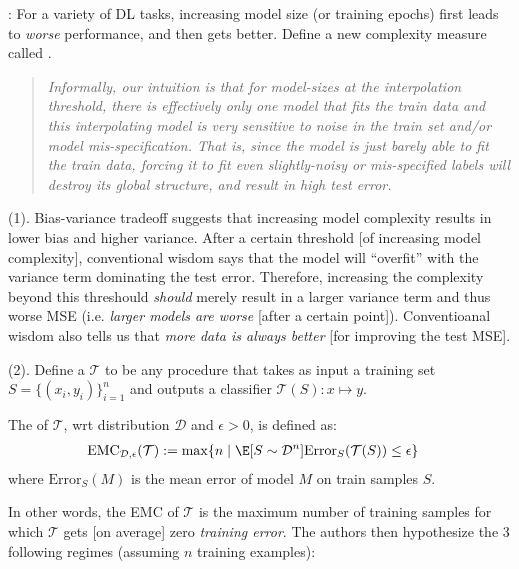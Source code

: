 \documentclass[11pt]{article}
\newcommand\myspace[1][]{\vspace{#1\bigskipamount}}
\newcommand\p{\Needspace{10\baselineskip} \noindent}
\newcommand\bluesec[1]{\myspace \p \blue{#1}}
\begin{document}
\bluesec{TL;DR}: For a variety of DL tasks, increasing model size (or training epochs) first leads to \textit{worse} performance, and then gets better. Define a new complexity measure called . 
\vspace{-0.5em}
\begin{quote}
	{\small\itshape
		Informally, our intuition is that for model-sizes at the interpolation threshold, there is effectively only one model that fits the train data and this interpolating model is very sensitive to noise in the train set and/or model mis-specification. That is, since the model is just barely able to fit the train data, forcing it to fit even slightly-noisy or mis-specified labels will destroy its global structure, and result in high test error.
	}
\end{quote}

\bluesec{Introduction} (1). Bias-variance tradeoff suggests that increasing model complexity results in lower bias and higher variance. After a certain threshold [of increasing model complexity], conventional wisdom says that the model will ``overfit'' with the variance term dominating the test error. Therefore, increasing the complexity beyond this threshould \textit{should} merely result in a larger variance term and thus worse MSE (i.e. \textit{larger models are worse} [after a certain point]). Conventioanal wisdom also tells us that \textit{more data is always better} [for improving the test MSE]. 

\bluesec{Results} (2). Define a  $\mathcal T$ to be any procedure that takes as input a training set $S = \{(x_i, y_i)\}_{i=1}^{n}$ and outputs a classifier $\mathcal T(S) : x \mapsto y$. 

\begin{definition}
	The  of $\mathcal T$, wrt distribution $\mathcal D$ and $\epsilon > 0$, is defined as:
	\begin{align}
		\mathrm{EMC}_{\mathcal D, \epsilon}(\mathcal T) 
			&:= \max\{   n \mid \E[S \sim \mathcal{D}^n]{\mathrm{Error}_S(\mathcal T (S))  } \le \epsilon \}
	\end{align}
	where $\mathrm{Error}_S(M)$ is the mean error of model $M$ on train samples $S$.
\end{definition}
In other words, the EMC of $\mathcal T$ is the maximum number of training samples for which $\mathcal T$ gets [on average] zero \textit{training error}. The authors then hypothesize the 3 following regimes (assuming $n$ training examples):
\end{document}
